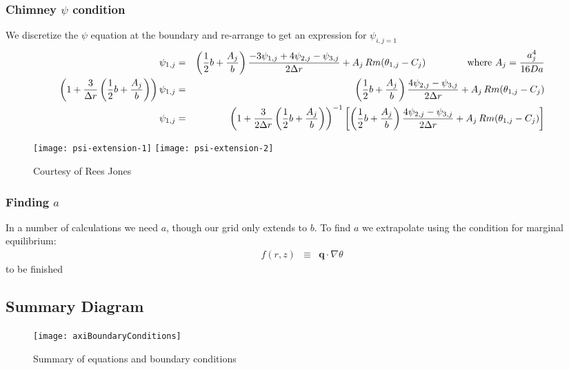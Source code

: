 \documentclass{article}
\begin{document}
\subsubsection{Chimney $\psi$ condition}
We discretize the $\psi$ equation at the boundary and re-arrange to get an expression for $\psi_{i, j=1}$
\begin{eqnarray}
\psi_{1, j} &=& \left( \frac{1}{2} b  + \frac{A_j}{b} \right) \frac{-3 \psi_{1, j} + 4 \psi_{2, j} - \psi_{3,j}}{2 \Delta r} +A_j \, Rm (\theta_{1,j} - C_j) \hspace{10ex} \text{where } A_j = \frac{a_j^4}{16 Da} \\
\left(1 + \frac{3}{\Delta r} \left(\frac{1}{2} b  + \frac{A_j}{b} \right)  \right) \psi_{1,j} &=& \left( \frac{1}{2} b  + \frac{A_j}{b} \right) \frac{4 \psi_{2, j} - \psi_{3,j}}{2 \Delta r} +A_j \, Rm (\theta_{1,j} - C_j) \\
\psi_{1,j} &=&\left(1 + \frac{3}{2 \Delta r} \left(\frac{1}{2} b  + \frac{A_j}{b} \right)  \right)^{-1} \left[ \left( \frac{1}{2} b  + \frac{A_j}{b} \right) \frac{4 \psi_{2, j} - \psi_{3,j}}{2 \Delta r} +A_j \, Rm (\theta_{1,j} - C_j) \right]
\end{eqnarray}

\begin{figure}[ht!]
    \centering
    \texttt{[image: psi-extension-1]}
     \texttt{[image: psi-extension-2]}
     \caption{Courtesy of Rees Jones}
 \end{figure}
 

\subsubsection{Finding $a$}
In a number of calculations we need $a$, though our grid only extends to $b$. To find $a$ we extrapolate using the condition for marginal equilibrium:
\begin{eqnarray}
f(r, z) &\equiv& \mathbf{q} \cdot \nabla \theta
\end{eqnarray}
to be finished

\subsection{Summary Diagram}

\begin{figure}[ht!]
    \centering
    \texttt{[image: axiBoundaryConditions]}
     \label{fig:boundary-conditions}
     \caption{Summary of equations and boundary conditions}
 \end{figure}
 
\end{document}
